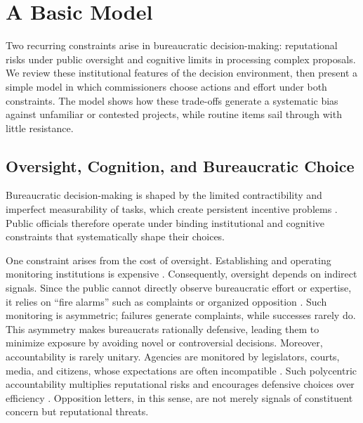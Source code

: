 \section{A Basic Model} \label{sec_model}

Two recurring constraints arise in bureaucratic decision-making: reputational risks under public oversight and cognitive limits in processing complex proposals. We review these institutional features of the decision environment, then present a simple model in which commissioners choose actions and effort under both constraints. The model shows how these trade-offs generate a systematic bias against unfamiliar or contested projects, while routine items sail through with little resistance.

\subsection{Oversight, Cognition, and Bureaucratic Choice}

Bureaucratic decision-making is shaped by the limited contractibility and imperfect measurability of tasks, which create persistent incentive problems \citep{Dixit2002}. Public officials therefore operate under binding institutional and cognitive constraints that systematically shape their choices.

One constraint arises from the cost of oversight. Establishing and operating monitoring institutions is expensive \citep{HuberShipan2000,DamonteDunlopRadaelli2014}. Consequently, oversight depends on indirect signals. Since the public cannot directly observe bureaucratic effort or expertise, it relies on ``fire alarms'' such as complaints or organized opposition \citep{Prendergast2003}. Such monitoring is asymmetric; failures generate complaints, while successes rarely do. This asymmetry makes bureaucrats rationally defensive, leading them to minimize exposure by avoiding novel or controversial decisions. Moreover, accountability is rarely unitary. Agencies are monitored by legislators, courts, media, and citizens, whose expectations are often incompatible \citep{Black2008,MaggettiPapadopoulos2018}. Such polycentric accountability multiplies reputational risks and encourages defensive choices over efficiency \citep{CarpenterKrause2012,GiladMaorBloom2015,BusuiocLodge2016}. Opposition letters, in this sense, are not merely signals of constituent concern but reputational threats.

